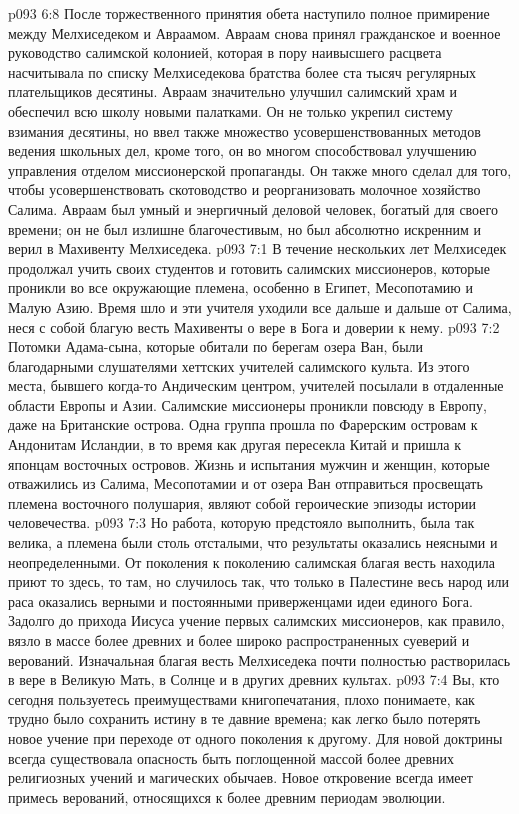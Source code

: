 \vs p093 6:8 После торжественного принятия обета наступило полное примирение между Мелхиседеком и Авраамом. Авраам снова принял гражданское и военное руководство салимской колонией, которая в пору наивысшего расцвета насчитывала по списку Мелхиседекова братства более ста тысяч регулярных плательщиков десятины. Авраам значительно улучшил салимский храм и обеспечил всю школу новыми палатками. Он не только укрепил систему взимания десятины, но ввел также множество усовершенствованных методов ведения школьных дел, кроме того, он во многом способствовал улучшению управления отделом миссионерской пропаганды. Он также много сделал для того, чтобы усовершенствовать скотоводство и реорганизовать молочное хозяйство Салима. Авраам был умный и энергичный деловой человек, богатый для своего времени; он не был излишне благочестивым, но был абсолютно искренним и верил в Махивенту Мелхиседека.
\vs p093 7:1 В течение нескольких лет Мелхиседек продолжал учить своих студентов и готовить салимских миссионеров, которые проникли во все окружающие племена, особенно в Египет, Месопотамию и Малую Азию. Время шло и эти учителя уходили все дальше и дальше от Салима, неся с собой благую весть Махивенты о вере в Бога и доверии к нему.
\vs p093 7:2 Потомки Адама\hyp{}сына, которые обитали по берегам озера Ван, были благодарными слушателями хеттских учителей салимского культа. Из этого места, бывшего когда\hyp{}то Андическим центром, учителей посылали в отдаленные области Европы и Азии. Салимские миссионеры проникли повсюду в Европу, даже на Британские острова. Одна группа прошла по Фарерским островам к Андонитам Исландии, в то время как другая пересекла Китай и пришла к японцам восточных островов. Жизнь и испытания мужчин и женщин, которые отважились из Салима, Месопотамии и от озера Ван отправиться просвещать племена восточного полушария, являют собой героические эпизоды истории человечества.
\vs p093 7:3 Но работа, которую предстояло выполнить, была так велика, а племена были столь отсталыми, что результаты оказались неясными и неопределенными. От поколения к поколению салимская благая весть находила приют то здесь, то там, но случилось так, что только в Палестине весь народ или раса оказались верными и постоянными приверженцами идеи единого Бога. Задолго до прихода Иисуса учение первых салимских миссионеров, как правило, вязло в массе более древних и более широко распространенных суеверий и верований. Изначальная благая весть Мелхиседека почти полностью растворилась в вере в Великую Мать, в Солнце и в других древних культах.
\vs p093 7:4 \pc Вы, кто сегодня пользуетесь преимуществами книгопечатания, плохо понимаете, как трудно было сохранить истину в те давние времена; как легко было потерять новое учение при переходе от одного поколения к другому. Для новой доктрины всегда существовала опасность быть поглощенной массой более древних религиозных учений и магических обычаев. Новое откровение всегда имеет примесь верований, относящихся к более древним периодам эволюции.
